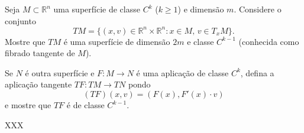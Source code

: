 \begin{homeworkProblem}
  Seja $M \subset \mathbb{R}^n$ uma superfície de classe $C^k$ ($k \geq 1$) e dimensão $m$. Considere o conjunto
    \[
    TM = \{(x,v) \in \mathbb{R}^n \times \mathbb{R}^n : x \in M, \, v \in T_x M\}.
    \]
    Mostre que $TM$ é uma superfície de dimensão $2m$ e classe $C^{k-1}$ (conhecida como fibrado tangente de $M$).

    Se $N$ é outra superfície e $F : M \to N$ é uma aplicação de classe $C^k$, defina a aplicação tangente $TF : TM \to TN$ pondo
    \[
    (TF)(x,v) = (F(x), F'(x)\cdot v)
    \]
    e mostre que $TF$ é de classe $C^{k-1}$.
  \begin{solution}
    XXX  
  \end{solution}
\end{homeworkProblem}
